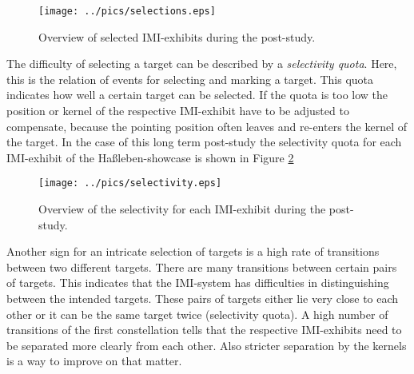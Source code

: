 
\begin{figure}[H]%
\texttt{[image: ../pics/selections.eps]}%
\caption{Overview of selected \ac{IMI}-exhibits during the post-study.}%
\label{fig:post-study_selections} %
\end{figure}

The difficulty of selecting a target can be described by a \textit{selectivity quota}. Here, this is the relation of events for selecting and marking a target. This quota indicates how well a certain target can be selected. If the quota is too low the position or kernel of the respective \ac{IMI}-exhibit have to be adjusted to compensate, because the pointing position often leaves and re-enters the kernel of the target. In the case of this long term post-study the selectivity quota for each \ac{IMI}-exhibit of the Haßleben-showcase is shown in Figure \ref{fig:post-study_selectivity}
\begin{figure}[H]%
\texttt{[image: ../pics/selectivity.eps]}%
\caption{Overview of the selectivity for each \ac{IMI}-exhibit during the post-study.}
\label{fig:post-study_selectivity} %
\end{figure}

Another sign for an intricate selection of targets is a high rate of transitions between two different targets. There are many transitions between certain pairs of targets. This indicates that the \ac{IMI}-system has difficulties in distinguishing between the intended targets. These pairs of targets either lie very close to each other or it can be the same target twice (selectivity quota). A high number of transitions of the first constellation tells that the respective \ac{IMI}-exhibits need to be separated more clearly from each other. Also stricter separation by the kernels is a way to improve on that matter.

